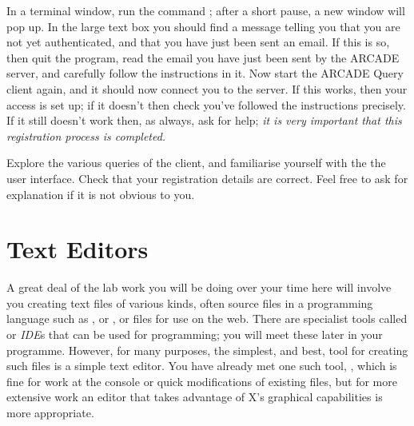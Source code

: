 In a terminal window, run the command ; after a short pause, a new window will pop up. In the large text box you should find a message telling you that you are not yet authenticated, and that you have just been sent an email. If this is so, then quit the program, read the email you have just been sent by the ARCADE server, and carefully follow the instructions in it. Now start the ARCADE Query client again, and it should now connect you to the server. If this works, then your access is set up; if it doesn't then check you've followed the instructions precisely. If it still doesn't work then, as always, ask for help; \emph{it is very important that this registration process is completed.}

Explore the various queries of the client, and familiarise yourself with the the user interface. Check that your registration details are correct. Feel free to ask for explanation if it is not obvious to you.

\section{Text Editors}





A great deal of the lab work you will be doing over your time here
will involve you creating text files of various kinds, often source
files in a programming language such as ,  or
, or  files for use on the web. There are
specialist tools called
 or \emph{IDE}s that can be used for programming; you
will meet these later in your programme. However, for many purposes,
the simplest, and best, tool for creating such files is a simple text
editor. You have already met one such tool, , which is
fine for work at the console or quick modifications of existing files,
but for more extensive work an editor that takes advantage of X's
graphical capabilities is more appropriate.

